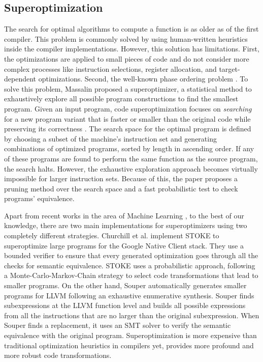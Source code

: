 \subsection*{Superoptimization}

The search for optimal algorithms to compute a function is as older as of the first compiler. This problem is commonly solved by using human-written heuristics inside the compiler implementations. However, this solution has limitations. First, the optimizations are applied to small pieces of code and do not consider more complex processes like instruction selections, register allocation, and target-dependent optimizations. Second, the well-known phase ordering problem \cite{phase-ordering-problem}. To solve this problem, Massalin \etal \cite{Massalin1987} proposed a superoptimizer, a statistical method to exhaustively explore all possible program constructions to find the smallest program.
Given an input program, code superoptimization focuses on \emph{searching} for a new program variant that is faster or smaller than the original code while preserving its correctness \cite{bunel_learning_2017}.
The search space for the optimal program is defined by choosing a subset of the machine's instruction set and generating combinations of optimized programs, sorted by length in ascending order. If any of these programs are found to perform the same function as the source program, the search halts. However, the exhaustive exploration approach becomes virtually impossible for larger instruction sets.
Because of this, the paper proposes a pruning method over the search space and a fast probabilistic test to check programs' equivalence.

Apart from recent works in the area of Machine Learning \cite{2021arXiv210913498S}, to the best of our knowledge, there are two main implementations for superoptimizers using two completely different strategies.
Churchill et al. \cite{churchill_sound_nodate} implement STOKE to superoptimize large programs for the  Google Native Client stack. They use a bounded verifier to ensure that every generated optimization goes through all the checks for semantic equivalence. STOKE uses a probabilistic approach, following a Monte-Carlo-Markov-Chain strategy to select code transformations that lead to smaller programs.
On the other hand, Souper \cite{bansal_automatic_nodate} automatically generates smaller programs for LLVM following an exhaustive enumerative synthesis. Souper finds subexpressions at the LLVM function level and builds all possible expressions from all the instructions that are no larger than the original subexpression. When Souper finds a replacement, it uses an SMT solver \cite{SMT_solver} to verify the semantic equivalence with the original program. 
Superoptimization is more expensive than traditional optimization heuristics in compilers yet, provides more profound and more robust code transformations.


